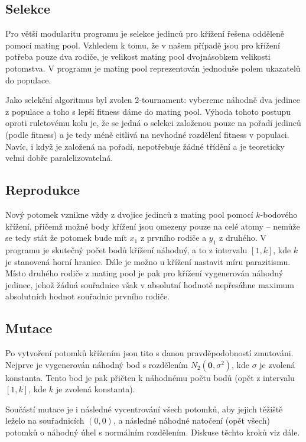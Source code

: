 \documentclass[journal]{IEEEtrancz}
\begin{document}
\subsection{Selekce}
Pro větší modularitu programu je selekce jedinců pro křížení řešena odděleně pomocí mating pool. Vzhledem k tomu, že v našem případě jsou pro křížení potřeba pouze dva rodiče, je velikost mating pool dvojnásobkem velikosti potomstva. V programu je mating pool reprezentován jednoduše polem ukazatelů do populace.

Jako selekční algoritmus byl zvolen 2-tournament: vybereme náhodně dva jedince z populace a toho s lepší fitness dáme do mating pool. Výhoda tohoto postupu oproti ruletovému kolu je, že se jedná o selekci založenou pouze na pořadí jedinců (podle fitness) a je tedy méně citlivá na nevhodné rozdělení fitness v populaci. Navíc, i když je založená na pořadí, nepotřebuje žádné třídění a je teoreticky velmi dobře paralelizovatelná.

\subsection{Reprodukce}
Nový potomek vznikne vždy z dvojice jedinců z mating pool pomocí $k$-bodového křížení, přičemž možné body křížení jsou omezeny pouze na celé atomy -- nemůže se tedy stát že potomek bude mít $x_1$ z prvního rodiče a $y_1$ z druhého. V programu je skutečný počet bodů křížení náhodný, a to z intervalu $[1,k]$, kde $k$ je stanovená horní hranice. Dále je možno u křížení nastavit míru parazitismu. Místo druhého rodiče z mating pool je pak pro křížení vygenerován náhodný jedinec, jehož žádná souřadnice však v absolutní hodnotě nepřesáhne maximum absolutních hodnot souřadnic prvního rodiče.

\subsection{Mutace}
Po vytvoření potomků křížením jsou tito s danou pravděpodobností zmutováni. Nejprve je vygenerován náhodný bod s rozdělením $N_2(\mathbf{0},\sigma^2)$, kde $\sigma$ je zvolená konstanta. Tento bod je pak přičten k náhodnému počtu bodů (opět z intervalu $[1,k]$, kde $k$ je zvolená konstanta).

Součástí mutace je i následné vycentrování všech potomků, aby jejich těžiště leželo na souřadnicích $(0,0)$, a následné náhodné natočení (opět všech) potomků o náhodný úhel s normálním rozdělením. Diskuse těchto kroků viz dále.
\end{document}
